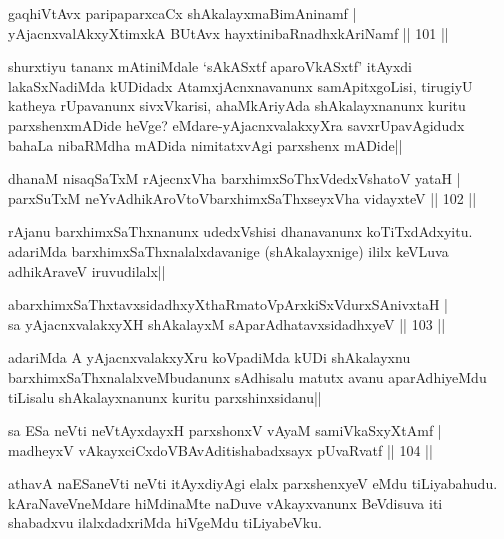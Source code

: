 \begin{shl}
gaqhiVtAvx paripaparxcaCx shAkalayxmaBimAninamf |\\
yAjacnxvalAkxyXtimxkA BUtAvx hayxtinibaRnadhxkAriNamf \hfill || 101 ||
\end{shl}

\begin{artha}%
shurxtiyu tananx mAtiniMdale `sAkASxtf aparoVkASxtf' itAyxdi lakaSxNadiMda kUDidadx AtamxjAcnxnavanunx samApitxgoLisi, tirugiyU katheya rUpavanunx sivxVkarisi, ahaMkAriyAda shAkalayxnanunx kuritu parxshenxmADide heVge? eMdare-yAjacnxvalakxyXra savxrUpavAgidudx bahaLa nibaRMdha mADida nimitatxvAgi parxshenx mADide||
\end{artha}


\begin{shl}
dhanaM nisaqSaTxM rAjecnxVha barxhimxSoThxVdedxVshatoV yataH |\\
parxSuTxM neYvAdhikAroV\s toV\s barxhimxSaThxseyxVha vidayxteV \hfill || 102 ||
\end{shl}

\begin{artha}
rAjanu barxhimxSaThxnanunx udedxVshisi dhanavanunx koTiTxdAdxyitu. adariMda barxhimxSaThxnalalxdavanige (shAkalayxnige) ililx keVLuva adhikAraveV iruvudilalx||
\end{artha}

\begin{shl}
abarxhimxSaThxtavxsidadhxyXthaRmatoV\s pArxkiSxVdurxSA\s nivxtaH |\\
sa yAjacnxvalakxyXH shAkalayxM sAparAdhatavxsidadhxyeV \hfill || 103 ||
\end{shl}

\begin{artha}
adariMda A yAjacnxvalakxyXru koVpadiMda kUDi shAkalayxnu barxhimxSaThxnalalxveMbudanunx sAdhisalu matutx avanu aparAdhiyeMdu tiLisalu shAkalayxnanunx kuritu parxshinxsidanu||
\end{artha}

\begin{shl}
sa ESa neVti neVtAyxdayxH parxshonxV vA\s yaM samiVkaSxyXtAmf |\\
madheyxV vAkayxciCxdoV\s BAvAditishabadxsayx pUvaRvatf \hfill || 104 ||
\end{shl}

\begin{artha}%
athavA naESaneVti neVti itAyxdiyAgi elalx parxshenxyeV eMdu tiLiyabahudu. kAraNaveVneMdare hiMdinaMte naDuve vAkayxvanunx BeVdisuva iti shabadxvu ilalxdadxriMda hiVgeMdu tiLiyabeVku.
\end{artha}

